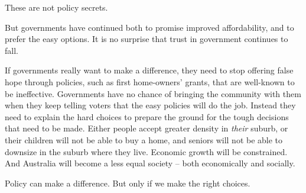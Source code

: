 \begin{Conclusion}
These are not policy secrets.

But governments have continued both to promise improved affordability, and to prefer the easy options. It is no surprise that trust in government continues to fall.

If governments really want to make a difference, they need to stop offering false hope through policies, such as first home-owners' grants, that are well-known to be ineffective. Governments have no chance of bringing the community with them when they keep telling voters that the easy policies will do the job. Instead they need to explain the hard choices to prepare the ground for the tough decisions that need to be made. Either people accept greater density in \textit{their} suburb, or their children will not be able to buy a home, and seniors will not be able to downsize in the suburb where they live. Economic growth will be constrained. And Australia will become a less equal society – both economically and socially. 

Policy can make a difference. But only if we make the right choices.

\end{Conclusion}


